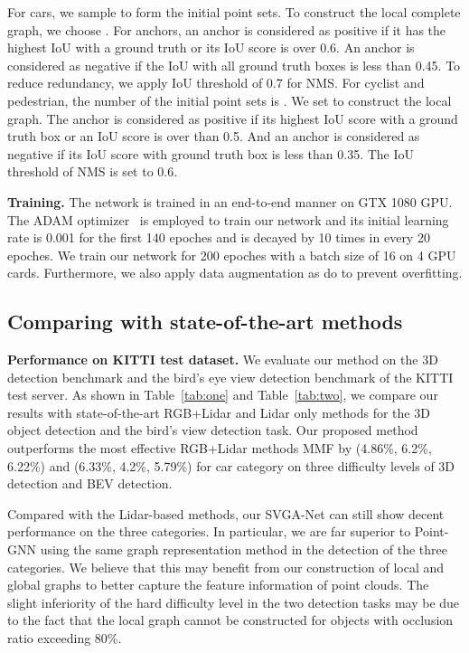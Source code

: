 \documentclass{article}
\begin{document}
For cars, we sample  to form the initial point sets. To construct the local complete graph, we choose . For anchors, an anchor is considered as positive if it has the highest IoU with a ground truth or its IoU score is over 0.6. An anchor is considered as negative if the IoU with all ground truth boxes is less than 0.45. To reduce redundancy, we apply IoU threshold of 0.7 for NMS. For cyclist and pedestrian, the number of the initial point sets is . We set  to construct the local graph. The anchor is considered as positive if its highest IoU score with a ground truth box or an IoU score is over than 0.5. And an anchor is considered as negative if its IoU score with ground truth box is less than 0.35. The IoU threshold of NMS is set to 0.6.

\textbf{Training.} The network is trained in an end-to-end manner on GTX 1080 GPU. The ADAM optimizer~\cite{kingma2014adam} is employed to train our network and its initial learning rate is 0.001 for the first 140 epoches and is decayed by 10 times in every 20 epoches. We train our network for 200 epoches with a batch size of 16 on 4 GPU cards. Furthermore, we also apply data augmentation as \cite{lang2019pointpillars,zhou2018voxelnet} do to prevent overfitting.
\subsection{Comparing with state-of-the-art methods }
\textbf{Performance on KITTI test dataset.} We evaluate our method on the 3D detection benchmark and the bird's eye view detection benchmark of the KITTI test server. As shown in Table~\ref{tab:one} and Table~\ref{tab:two}, we compare our results with state-of-the-art RGB+Lidar and Lidar only methods for the 3D object detection and the bird’s view detection task. Our proposed method outperforms the most effective RGB+Lidar methods MMF\cite{liang2019multi} by (4.86\%, 6.2\%, 6.22\%) and (6.33\%, 4.2\%, 5.79\%) for car category on three difficulty levels of 3D detection and BEV detection.

Compared with the Lidar-based methods, our SVGA-Net can still show decent performance on the three categories. In particular, we are far superior to Point-GNN\cite{Point-GNN} using the same graph representation method in the detection of the three categories. We believe that this may benefit from our construction of local and global graphs to better capture the feature information of point clouds. The slight inferiority of the hard difficulty level in the two detection tasks may be due to the fact that the local graph cannot be constructed for objects with occlusion ratio exceeding 80\%.
\end{document}
